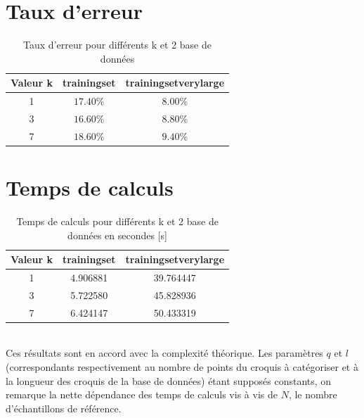 \documentclass[a4paper, 11pt]{article}
\begin{document}
\section{Taux d'erreur}
\begin{table}[H]
    \centering
    \begin{tabular}{| c || c | c |}
        \hline
        Valeur k &  trainingset & trainingsetverylarge  \\
        \hline
        1        &  $17.40 \%$            &        $8.00 \%$            \\
        \hline
        3        &  $16.60 \%$            &       $8.80 \%$              \\
        \hline
        7        &  $18.60 \%$              &        $9.40 \%$             \\
        \hline
    \end{tabular}
    \caption{Taux d'erreur pour différents k et 2 base de données}
    \label{tab:error}
\end{table}

\section{Temps de calculs}
\begin{table}[H]
    \centering
    \begin{tabular}{| c || c | c |}
        \hline
        Valeur k &  trainingset & trainingsetverylarge  \\
        \hline
        1        &  4.906881              &        39.764447            \\
        \hline
        3        &  5.722580                  &          45.828936          \\
        \hline
        7        &  6.424147                  &           50.433319         \\
        \hline
    \end{tabular}
    \caption{Temps de calculs pour différents k et 2 base de données en secondes [s]}
    \label{tab:tps}
\end{table}\\
Ces résultats sont en accord avec la complexité théorique. Les paramètres $q$ et $l$ (correspondants respectivement au nombre de points du croquis à catégoriser et à la longueur des croquis de la base de données) étant supposés constants, on remarque la nette dépendance des temps de calculs vis à vis de $N$, le nombre d'échantillons de référence.\\
\end{document}

